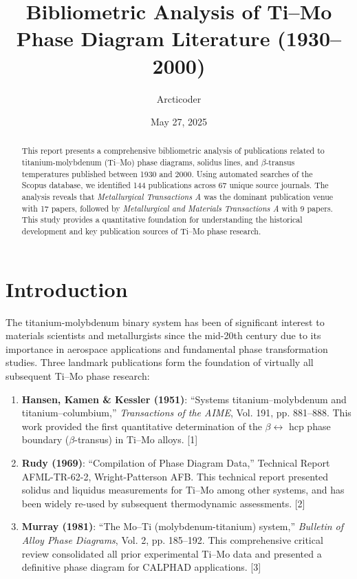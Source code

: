\documentclass[11pt,a4paper]{article}
\title{Bibliometric Analysis of Ti--Mo Phase Diagram Literature (1930--2000)}
\author{Arcticoder}
\date{May 27, 2025}
\begin{document}
\maketitle

\begin{abstract}
This report presents a comprehensive bibliometric analysis of publications related to titanium-molybdenum (Ti--Mo) phase diagrams, solidus lines, and $\beta$-transus temperatures published between 1930 and 2000. Using automated searches of the Scopus database, we identified 144 publications across 67 unique source journals. The analysis reveals that \textit{Metallurgical Transactions A} was the dominant publication venue with 17 papers, followed by \textit{Metallurgical and Materials Transactions A} with 9 papers. This study provides a quantitative foundation for understanding the historical development and key publication sources of Ti--Mo phase research.
\end{abstract}

\section{Introduction}

The titanium-molybdenum binary system has been of significant interest to materials scientists and metallurgists since the mid-20th century due to its importance in aerospace applications and fundamental phase transformation studies. Three landmark publications form the foundation of virtually all subsequent Ti--Mo phase research:

\begin{enumerate}    \item \textbf{Hansen, Kamen \& Kessler (1951)}: ``Systems titanium--molybdenum and titanium--columbium,'' \textit{Transactions of the AIME}, Vol. 191, pp. 881--888. This work provided the first quantitative determination of the $\beta \leftrightarrow$ hcp phase boundary ($\beta$-transus) in Ti--Mo alloys. [1]
    
    \item \textbf{Rudy (1969)}: ``Compilation of Phase Diagram Data,'' Technical Report AFML-TR-62-2, Wright-Patterson AFB. This technical report presented solidus and liquidus measurements for Ti--Mo among other systems, and has been widely re-used by subsequent thermodynamic assessments. [2]
    
    \item \textbf{Murray (1981)}: ``The Mo--Ti (molybdenum-titanium) system,'' \textit{Bulletin of Alloy Phase Diagrams}, Vol. 2, pp. 185--192. This comprehensive critical review consolidated all prior experimental Ti--Mo data and presented a definitive phase diagram for CALPHAD applications. [3]
\end{enumerate}
\end{document}
